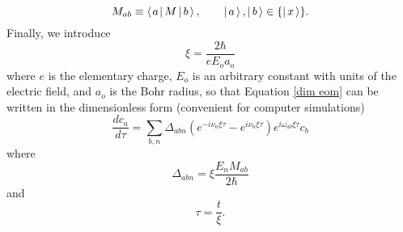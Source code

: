 \begin{equation}
M_{ab}
\equiv
\left\langle \hspace{0.10em}a \hspace{0.10em}\right| M \left| \hspace{0.15em} b \hspace{0.15em}\right\rangle,
\qquad
\left| \hspace{0.15em} a \hspace{0.15em}\right\rangle,\left| \hspace{0.15em} b \hspace{0.15em}\right\rangle
\in
\{\left| \hspace{0.15em} x \hspace{0.15em}\right\rangle\}.
\label{matrix element}
\end{equation}
Finally, we introduce
\begin{equation}
\xi
=
\frac
{2 \hbar}
{e E_{o} a_o}
\end{equation}
where $e$ is the elementary charge, $E_{o}$ is an arbitrary constant with units of the electric field, and $a_o$ is the Bohr radius, so that Equation \ref{dim eom} can be written in the dimensionless form (convenient for computer simulations)
\begin{equation}
\frac
{dc_a}
{d\tau}
=
\sum_{b,n}
\Delta_{abn}
(
e^{-i \nu_n \xi \tau}
-
e^{i \nu_n \xi \tau}
)
e^{i \omega_{ab} \xi \tau}
c_b
\label{eom}
\end{equation}
where
\begin{equation}
\Delta_{abn}
=
\xi \frac{E_n M_{ab}}{2 \hbar}
\label{Delta}
\end{equation}
and
\begin{equation}
\tau
=
\frac{t}{\xi}.
\label{tau}
\end{equation}
